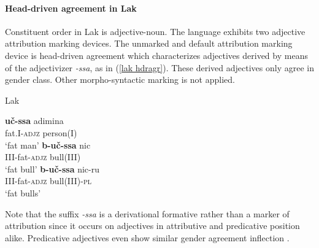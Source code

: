 \paragraph{Head-driven agreement in Lak}
Constituent order in Lak is adjective-noun. The language exhibits two adjective attribution marking devices. The unmarked and default attribution marking device is head-driven agreement which characterizes adjectives derived by means of the adjectivizer \mbox{\textit{-ssa}}, as in (\ref{lak hdragr}). These derived adjectives only agree in gender class. Other morpho-syntactic marking is not applied.
\begin{exe}
\ex 
\label{lak hdragr}
\rm{Lak \citep[48]{zirkov1955}} 
\begin{xlist}
\ex 
\gll	\textbf{uč-ssa} adimina\\
	fat.\textsc{I}-\textsc{adjz} person(\textsc{I})\\
\glt	‘fat man’
\gll	\textbf{b-uč-ssa} nic\\
	\textsc{III}-fat-\textsc{adjz} bull\textsc{(III)}\\
\glt	‘fat bull’
\ex
\gll	\textbf{b-uč-ssa} nic-ru\\
	\textsc{III}-fat-\textsc{adjz} bull\textsc{(III)}-\textsc{pl}\\
\glt	‘fat bulls’
\end{xlist}
\end{exe}
Note that the suffix \textit{-ssa} is a derivational formative rather than a marker of attribution since it occurs on adjectives in attributive and predicative position alike. Predicative adjectives even show similar gender agreement inflection \citep[45–51]{zirkov1955}.

